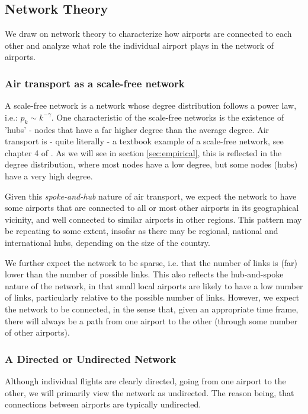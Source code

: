\subsection{Network Theory}
\label{subsec:Network Theory}
We draw on network theory to characterize how airports are connected to each other and analyze what role the individual airport plays in the network of airports. %

\subsubsection{Air transport as a scale-free network}
A scale-free network is a network whose degree distribution follows a power law, i.e.: $p_k \sim k^{-\gamma}$. One characteristic of the scale-free networks is the existence of 'hubs' - nodes that have a far higher degree than the average degree. Air transport is - quite literally - a textbook example of a scale-free network, see chapter 4 of \citet{barabasi2016networks}. As we will see in section \ref{sec:empirical}, this is reflected in the degree distribution, where most nodes have a low degree, but some nodes (hubs) have a very high degree.

Given this \textit{spoke-and-hub} nature of air transport, we expect the network to have some airports that are connected to all or most other airports in its geographical vicinity, and well connected to similar airports in other regions. This pattern may be repeating to some extent, insofar as there may be regional, national and international hubs, depending on the size of the country. 

We further expect the network to be sparse, i.e. that the number of links is (far) lower than the number of possible links. This also reflects the hub-and-spoke nature of the network, in that small local airports are likely to have a low number of links, particularly relative to the possible number of links. However, we expect the network to be connected, in the sense that, given an appropriate time frame, there will always be a path from one airport to the other (through some number of other airports).

\subsubsection{A Directed or Undirected Network}
Although individual flights are clearly directed, going from one airport to the other, we will primarily view the network as undirected. The reason being, that connections between airports are typically undirected.


